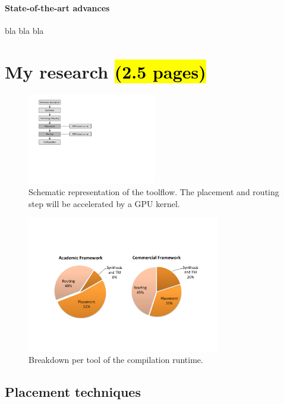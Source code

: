 \documentclass[a4paper,oneside,12pt]{article}
\begin{document}
\paragraph{State-of-the-art advances}
bla bla bla

\section{My research \hl{(2.5 pages)}}

\begin{figure}[ht]
\centering
\includegraphics[width = 0.50\textwidth,trim = 0mm 90mm 140mm 2mm, clip]{toolflow}
\caption{Schematic representation of the toolflow. The placement and routing step will be accelerated by a GPU kernel.}
\label{toolflow}
\end{figure}

\begin{figure}[ht]
\centering
\includegraphics[width = 0.75\textwidth,trim = 0mm 50mm 0mm 40mm, clip]{runtime_breakdown}
\caption{Breakdown per tool of the compilation runtime.}
\label{toolflows}
\end{figure}

\subsection{Placement techniques}\label{placetech}
\end{document}
